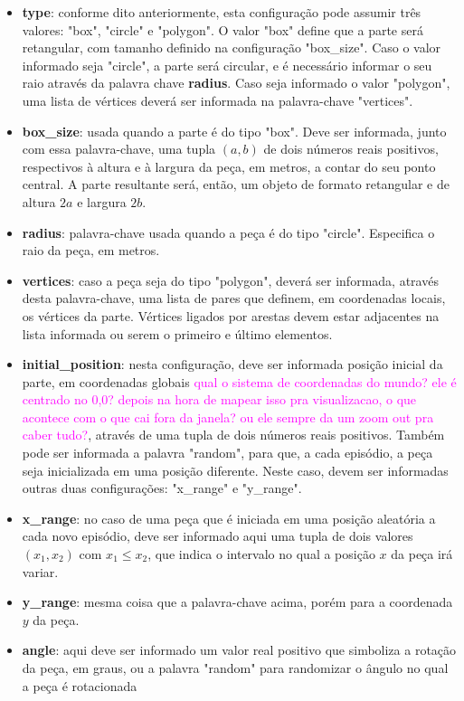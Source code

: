 \documentclass[cic,tc]{iiufrgs}
\newcommand\bruno[1]{\textcolor{magenta}{#1}}
\begin{document}
 \begin{itemize}
   \item \textbf{type}: conforme dito anteriormente, esta configuração pode assumir três valores: "box", "circle" e "polygon". O valor "box" define que
   a parte será retangular, com tamanho definido na configuração "box\_size". Caso o valor informado seja "circle", a parte será circular, e é necessário
   informar o seu raio através da palavra chave \textbf{radius}. Caso seja informado o valor "polygon", uma lista de vértices deverá ser informada na palavra-chave
   "vertices".
   \item \textbf{box\_size}: usada quando a parte é do tipo "box". Deve ser informada, junto com essa palavra-chave, uma tupla $(a, b)$ de dois números reais positivos,
   respectivos à altura e à largura da peça, em metros, a contar do seu ponto central. A parte resultante será, então, um objeto de formato retangular e de altura $2a$ e largura $2b$.
   \item \textbf{radius}: palavra-chave usada quando a peça é do tipo "circle". Especifica o raio da peça, em metros.
   \item \textbf{vertices}: caso a peça seja do tipo "polygon", deverá ser informada, através desta palavra-chave, uma lista de pares que definem, em coordenadas locais, os vértices da parte.
   Vértices ligados por arestas devem estar adjacentes na lista informada ou serem o primeiro e último elementos.
   \item \textbf{initial\_position}: nesta configuração, deve ser informada posição inicial da parte, em coordenadas globais \bruno{qual o sistema de coordenadas do mundo? ele é centrado no 0,0? depois na hora de mapear isso pra visualizacao, o que acontece com o que cai fora da janela? ou ele sempre da um zoom out pra caber tudo?}, através de uma tupla de dois números reais positivos. Também pode ser
   informada a palavra "random", para que, a cada episódio, a peça seja inicializada em uma posição diferente. Neste caso, devem ser informadas outras duas configurações: "x\_range" e "y\_range".
   \item \textbf{x\_range}: no caso de uma peça que é iniciada em uma posição aleatória a cada novo episódio, deve ser informado aqui uma tupla de dois valores $(x_1, x_2)$ com $x_1 \leq x_2$, que indica
   o intervalo no qual a posição $x$ da peça irá variar.
   \item \textbf{y\_range}: mesma coisa que a palavra-chave acima, porém para a coordenada $y$ da peça.
   \item \textbf{angle}: aqui deve ser informado um valor real positivo que simboliza a rotação da peça, em graus, ou a palavra "random" para randomizar o ângulo no qual a peça é rotacionada

\end{itemize}
\end{document}
